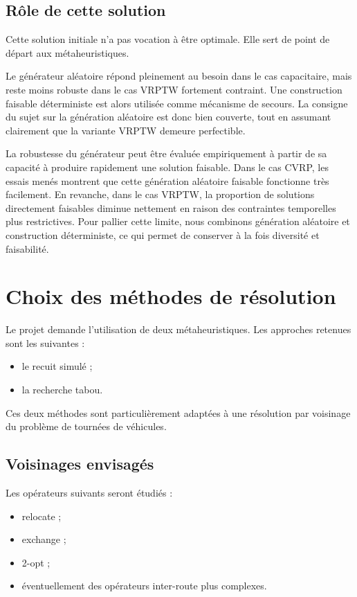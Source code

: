 \documentclass[11pt,a4paper]{article}
\begin{document}
\subsection{Rôle de cette solution}
Cette solution initiale n'a pas vocation à être optimale. Elle sert de point de départ aux métaheuristiques.

Le générateur aléatoire répond pleinement au besoin dans le cas capacitaire, mais reste moins robuste dans le cas VRPTW fortement contraint. Une construction faisable déterministe est alors utilisée comme mécanisme de secours. La consigne du sujet sur la génération aléatoire est donc bien couverte, tout en assumant clairement que la variante VRPTW demeure perfectible.

La robustesse du générateur peut être évaluée empiriquement à partir de sa capacité à produire rapidement une solution faisable. Dans le cas CVRP, les essais menés montrent que cette génération aléatoire faisable fonctionne très facilement. En revanche, dans le cas VRPTW, la proportion de solutions directement faisables diminue nettement en raison des contraintes temporelles plus restrictives. Pour pallier cette limite, nous combinons génération aléatoire et construction déterministe, ce qui permet de conserver à la fois diversité et faisabilité.

\section{Choix des méthodes de résolution}

Le projet demande l'utilisation de deux métaheuristiques. Les approches retenues sont les suivantes :
\begin{itemize}
    \item le recuit simulé ;
    \item la recherche tabou.
\end{itemize}

Ces deux méthodes sont particulièrement adaptées à une résolution par voisinage du problème de tournées de véhicules.

\subsection{Voisinages envisagés}
Les opérateurs suivants seront étudiés :
\begin{itemize}
    \item relocate ;
    \item exchange ;
    \item 2-opt ;
    \item éventuellement des opérateurs inter-route plus complexes.
\end{itemize}
\end{document}
